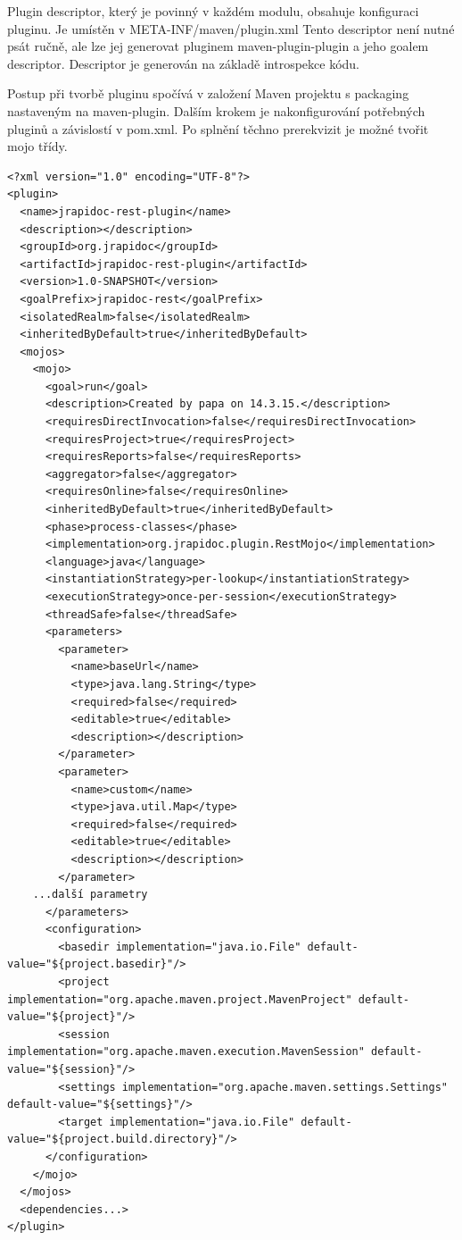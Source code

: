 \documentclass[11pt,twoside,a4paper]{book}
\begin{document}
Plugin descriptor, který je povinný v každém modulu, obsahuje konfiguraci pluginu. Je
umístěn v META-INF/maven/plugin.xml Tento descriptor není nutné psát ručně, ale lze jej
generovat pluginem maven-plugin-plugin a jeho goalem descriptor. Descriptor je generován
na základě introspekce kódu.

Postup při tvorbě pluginu spočívá v založení Maven projektu s packaging nastaveným na
maven-plugin. Dalším krokem je nakonfigurování potřebných pluginů a závislostí v pom.xml.
Po splnění těchno prerekvizit je možné tvořit mojo třídy.

\begin{lstlisting}[frame=single]
<?xml version="1.0" encoding="UTF-8"?>
<plugin>
  <name>jrapidoc-rest-plugin</name>
  <description></description>
  <groupId>org.jrapidoc</groupId>
  <artifactId>jrapidoc-rest-plugin</artifactId>
  <version>1.0-SNAPSHOT</version>
  <goalPrefix>jrapidoc-rest</goalPrefix>
  <isolatedRealm>false</isolatedRealm>
  <inheritedByDefault>true</inheritedByDefault>
  <mojos>
    <mojo>
      <goal>run</goal>
      <description>Created by papa on 14.3.15.</description>
      <requiresDirectInvocation>false</requiresDirectInvocation>
      <requiresProject>true</requiresProject>
      <requiresReports>false</requiresReports>
      <aggregator>false</aggregator>
      <requiresOnline>false</requiresOnline>
      <inheritedByDefault>true</inheritedByDefault>
      <phase>process-classes</phase>
      <implementation>org.jrapidoc.plugin.RestMojo</implementation>
      <language>java</language>
      <instantiationStrategy>per-lookup</instantiationStrategy>
      <executionStrategy>once-per-session</executionStrategy>
      <threadSafe>false</threadSafe>
      <parameters>
        <parameter>
          <name>baseUrl</name>
          <type>java.lang.String</type>
          <required>false</required>
          <editable>true</editable>
          <description></description>
        </parameter>
        <parameter>
          <name>custom</name>
          <type>java.util.Map</type>
          <required>false</required>
          <editable>true</editable>
          <description></description>
        </parameter>
    ...další parametry
      </parameters>
      <configuration>
        <basedir implementation="java.io.File" default-value="${project.basedir}"/>
        <project implementation="org.apache.maven.project.MavenProject" default-value="${project}"/>
        <session implementation="org.apache.maven.execution.MavenSession" default-value="${session}"/>
        <settings implementation="org.apache.maven.settings.Settings" default-value="${settings}"/>
        <target implementation="java.io.File" default-value="${project.build.directory}"/>
      </configuration>
    </mojo>
  </mojos>
  <dependencies...>
</plugin>
\end{lstlisting}
\end{document}
